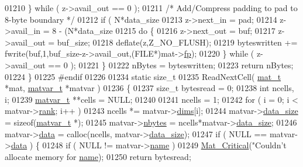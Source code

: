 \begin{DoxyCode}
{{{{01210     \} \textcolor{keywordflow}{while} ( z->avail\_out == 0 );
01211     \textcolor{comment}{/* Add/Compress padding to pad to 8-byte boundary */}
01212     \textcolor{keywordflow}{if} ( N*data\_size %
01213         z->next\_in  = pad;
01214         z->avail\_in = 8 - (N*data\_size %
01215         \textcolor{keywordflow}{do} \{
01216             z->next\_out  = buf;
01217             z->avail\_out = buf\_size;
01218             deflate(z,Z\_NO\_FLUSH);
01219             byteswritten += fwrite(buf,1,buf\_size-z->avail\_out,(FILE*)mat->\hyperlink{struct__mat__t_a85f562e407ca9ad4d2a6e14f839432b7}{fp});
01220         \} \textcolor{keywordflow}{while} ( z->avail\_out == 0 );
01221     \}
01222     nBytes = byteswritten;
01223     \textcolor{keywordflow}{return} nBytes;
01224 \}
01225 \textcolor{preprocessor}{#endif}
01226 
01234 \textcolor{keyword}{static} \textcolor{keywordtype}{size\_t}
01235 ReadNextCell( \hyperlink{struct__mat__t}{mat\_t} *mat, \hyperlink{group___m_a_t_structmatvar__t}{matvar\_t} *matvar )
01236 \{
01237     \textcolor{keywordtype}{size\_t} bytesread = 0;
01238     \textcolor{keywordtype}{int} ncells, i;
01239     \hyperlink{group___m_a_t_structmatvar__t}{matvar\_t} **cells = NULL;
01240 
01241     ncells = 1;
01242     \textcolor{keywordflow}{for} ( i = 0; i < matvar->\hyperlink{group___m_a_t_a84ba70c96ded13cc555fa75b768d9921}{rank}; i++ )
01243         ncells *= matvar->\hyperlink{group___m_a_t_a8e01234e1c862ce3472bb37f5a09b92c}{dims}[i];
01244     matvar->\hyperlink{group___m_a_t_a9ad1c82e2b568da617e12dc73a26e1f9}{data\_size} = \textcolor{keyword}{sizeof}(\hyperlink{group___m_a_t_structmatvar__t}{matvar\_t} *);
01245     matvar->\hyperlink{group___m_a_t_abf1c844540503be2df9bb3db93cfe307}{nbytes}    = ncells*matvar->\hyperlink{group___m_a_t_a9ad1c82e2b568da617e12dc73a26e1f9}{data\_size};
01246     matvar->\hyperlink{group___m_a_t_a5672978efa230bbdecdf38ede781f7fa}{data}      = calloc(ncells, matvar->\hyperlink{group___m_a_t_a9ad1c82e2b568da617e12dc73a26e1f9}{data\_size});
01247     \textcolor{keywordflow}{if} ( NULL == matvar->\hyperlink{group___m_a_t_a5672978efa230bbdecdf38ede781f7fa}{data} ) \{
01248         \textcolor{keywordflow}{if} ( NULL != matvar->\hyperlink{group___m_a_t_a5d4b55b041e3b4fb50c04337f05ad909}{name} )
01249             \hyperlink{group__mat__util_gaf51f2bfbb5580f575e4dd79757e2b80c}{Mat\_Critical}(\textcolor{stringliteral}{"Couldn't allocate memory for %
      \hyperlink{group___m_a_t_a5d4b55b041e3b4fb50c04337f05ad909}{name});
01250         \textcolor{keywordflow}{return} bytesread;
}}}}}
\end{DoxyCode}
